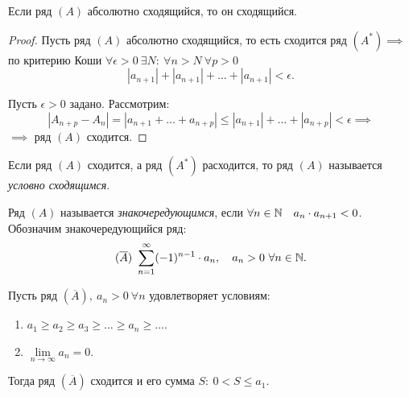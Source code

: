 \begin{statement}
    Если ряд $(A)$ абсолютно сходящийся, то он сходящийся.
\end{statement}

\begin{proof}
    Пусть ряд $(A)$ абсолютно сходящийся, то есть сходится ряд $(A^*) \implies$ по критерию Коши $\forall \epsilon > 0 \ \exists N: \ \forall n > N \ \forall p > 0$
    \[
        |a_{n+1}| + |a_{n+1}| + \ldots + |a_{n+1}| < \epsilon.
    \]

    Пусть $\epsilon > 0$ задано. Рассмотрим:
    \[
        |A_{n+p} - A_n| = |a_{n+1} + \ldots + a_{n+p}| \leqslant |a_{n+1}| + \ldots + |a_{n+p}| < \epsilon \implies
    \]
    $\implies$ ряд $(A)$ сходится.
\end{proof}

\begin{definition}
    Если ряд $(A)$ сходится, а ряд $(A^*)$ расходится, то ряд $(A)$ называется \emph{условно сходящимся}.
\end{definition}

\begin{definition}
    Ряд $(A)$ называется \emph{знакочередующимся}, если $\forall n \in \mathbb{N} \quad a_n \cdot a_{n+1} < 0$. Обозначим знакочередующийся ряд:
    \[
        (\overline{A}) \ \sum_{n=1}^{\infty}(-1)^{n-1}\cdot a_n, \quad a_n > 0 \ \forall n \in\N.
    \]
\end{definition}

\begin{theorem}
    Пусть ряд $(\overline{A}), \ a_n > 0 \ \forall n$ удовлетворяет условиям:
    \begin{enumerate}
        \item $a_1 \geqslant a_2 \geqslant a_3 \geqslant \ldots \geqslant a_n \geqslant \ldots$.
        \item $\underset{n\rightarrow\infty}{\lim} a_n = 0$.
    \end{enumerate}

    Тогда ряд $(\overline{A})$ сходится и его сумма $S: \ 0 < S \leqslant a_1$.
\end{theorem}

